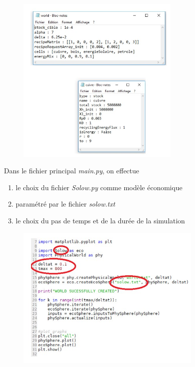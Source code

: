 \documentclass[12pt,a4paper]{article}%
\begin{document}
\begin{figure}[h]
\centering\includegraphics[width=0.7\textwidth]{figures/Parametrisation.jpg}
\end{figure}


Dans le fichier principal \textit{main.py}, on effectue 

\begin{enumerate}
\item le choix du fichier \textit{Solow.py} comme modèle économique

\item paramétré par le fichier \textit{solow.txt} 

\item le choix du pas de temps et de la durée de la simulation
\end{enumerate}

\begin{figure}[h]
\centering\includegraphics[width=0.8\textwidth]{figures/Parametrisation2.jpg}
\end{figure}
\end{document}
